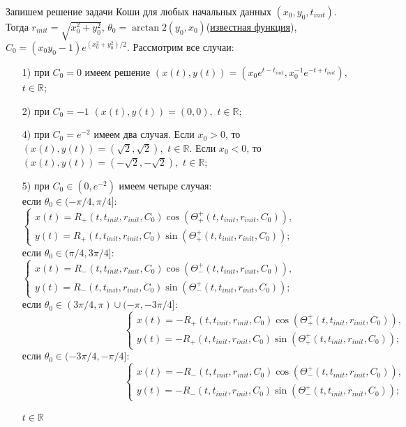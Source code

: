 Запишем решение задачи Коши для любых начальных данных $(x_0, y_0, t_{init})$. Тогда $r_{init} = \sqrt{x_0^2 + y_0^2}$, $\theta_0 = \arctan2(y_0, x_0)$(\href{https://en.wikipedia.org/wiki/Atan2}{известная функция}), $C_{0} = (x_0y_0 - 1)e^{(x_0^2+y_0^2)/2}$. Рассмотрим все случаи:
\begin{enumerate}
    \item[{1)}] при $C_0 = 0$ имеем решение $(x(t), y(t)) = (x_0e^{t-t_{init}}, x_0^{-1}e^{-t+t_{init}}),$ $t\in \mathbb{R}$;
    \item[{2)}] при $C_0 = -1$ $(x(t), y(t)) = (0,0),$ $t\in \mathbb{R}$;
    \item[{4)}] при $C_0 = e^{-2}$ имеем два случая. Если $x_ 0> 0$, то $(x(t), y(t)) = (\sqrt{2},\sqrt{2}),$ $t\in \mathbb{R}$. Если $x_ 0< 0$, то $(x(t), y(t)) = (-\sqrt{2},-\sqrt{2}),$ $t\in \mathbb{R}$;
\item[{5)}] при $C_0\in(0,e^{-2})$ имеем четыре случая:\\
если $\theta_0 \in (-\pi/4, \pi/4]$:
$ \begin{cases}
       x(t) = R_+(t,t_{init}, r_{init}, C_0)\cos(\Theta^+_+(t,t_{init},r_{init},C_0)),\\
       y(t) = R_+(t,t_{init}, r_{init}, C_0)\sin(\Theta^+_+(t,t_{init},r_{init},C_0));
\end{cases}$ \\
если $\theta_0 \in (\pi/4, 3\pi/4]$:
$ \begin{cases}
       x(t) = R_-(t,t_{init}, r_{init}, C_0)\cos(\Theta^+_-(t,t_{init},r_{init},C_0)),\\
       y(t) = R_-(t,t_{init}, r_{init}, C_0)\sin(\Theta^+_-(t,t_{init},r_{init},C_0));
\end{cases}$ \\
если $ \theta_0 \in (3\pi/4, \pi)\cup(-\pi, -3\pi/4]$:\\
$\hspace{125pt} \begin{cases}
       x(t) = -R_+(t,t_{init}, r_{init}, C_0)\cos(\Theta^+_+(t,t_{init},r_{init},C_0)),\\
       y(t) = -R_+(t,t_{init}, r_{init}, C_0)\sin(\Theta^+_+(t,t_{init},r_{init},C_0));
\end{cases}$ \\
если $\theta_0 \in (-3\pi/4, -\pi/4]$:\\
$\hspace{125pt} \begin{cases}
       x(t) = -R_-(t,t_{init}, r_{init}, C_0)\cos(\Theta^+_-(t,t_{init},r_{init},C_0)),\\
       y(t) = -R_-(t,t_{init}, r_{init}, C_0)\sin(\Theta^+_-(t,t_{init},r_{init},C_0));
\end{cases}$ \\
\begin{center}
    $t\in \mathbb{R}$
\end{center}


\end{enumerate}
